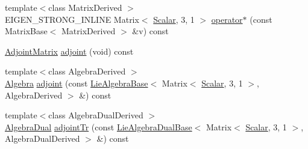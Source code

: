 \begin{DoxyCompactItemize}
\item 
{\footnotesize template$<$class Matrix\+Derived $>$ }\\E\+I\+G\+E\+N\+\_\+\+S\+T\+R\+O\+N\+G\+\_\+\+I\+N\+L\+I\+NE Matrix$<$ \hyperlink{class_lie_group_base_3_01_quaternion_3_01typename_01internal_1_1traits_3_01_derived_01_4_1_1_scalar_01_4_00_01_derived_01_4_afadeceb3b98e52deecc572e71efb82a8}{Scalar}, 3, 1 $>$ \hyperlink{class_lie_group_base_3_01_quaternion_3_01typename_01internal_1_1traits_3_01_derived_01_4_1_1_scalar_01_4_00_01_derived_01_4_acb8d7d01cc37f10c72eb76b65754b46a}{operator$\ast$} (const Matrix\+Base$<$ Matrix\+Derived $>$ \&v) const
\item 
\hyperlink{class_lie_group_base_3_01_quaternion_3_01typename_01internal_1_1traits_3_01_derived_01_4_1_1_scalar_01_4_00_01_derived_01_4_a78de97b1de2faa5ee198be16e6b61931}{Adjoint\+Matrix} \hyperlink{class_lie_group_base_3_01_quaternion_3_01typename_01internal_1_1traits_3_01_derived_01_4_1_1_scalar_01_4_00_01_derived_01_4_a75f0e03d56ddc8d87cf14b37bb3662d2}{adjoint} (void) const
\item 
{\footnotesize template$<$class Algebra\+Derived $>$ }\\\hyperlink{class_lie_group_base_3_01_quaternion_3_01typename_01internal_1_1traits_3_01_derived_01_4_1_1_scalar_01_4_00_01_derived_01_4_a0a25a28e133c962ab8524a766ae6a01c}{Algebra} \hyperlink{class_lie_group_base_3_01_quaternion_3_01typename_01internal_1_1traits_3_01_derived_01_4_1_1_scalar_01_4_00_01_derived_01_4_a0247c73a22ac8b68f598f49141d078e0}{adjoint} (const \hyperlink{class_lie_algebra_base}{Lie\+Algebra\+Base}$<$ Matrix$<$ \hyperlink{class_lie_group_base_3_01_quaternion_3_01typename_01internal_1_1traits_3_01_derived_01_4_1_1_scalar_01_4_00_01_derived_01_4_afadeceb3b98e52deecc572e71efb82a8}{Scalar}, 3, 1 $>$, Algebra\+Derived $>$ \&) const
\item 
{\footnotesize template$<$class Algebra\+Dual\+Derived $>$ }\\\hyperlink{class_lie_group_base_3_01_quaternion_3_01typename_01internal_1_1traits_3_01_derived_01_4_1_1_scalar_01_4_00_01_derived_01_4_a2ae739f86fece047d4d480127d5b5d55}{Algebra\+Dual} \hyperlink{class_lie_group_base_3_01_quaternion_3_01typename_01internal_1_1traits_3_01_derived_01_4_1_1_scalar_01_4_00_01_derived_01_4_a92f173f459bb220e1373f3adde873e51}{adjoint\+Tr} (const \hyperlink{class_lie_algebra_dual_base}{Lie\+Algebra\+Dual\+Base}$<$ Matrix$<$ \hyperlink{class_lie_group_base_3_01_quaternion_3_01typename_01internal_1_1traits_3_01_derived_01_4_1_1_scalar_01_4_00_01_derived_01_4_afadeceb3b98e52deecc572e71efb82a8}{Scalar}, 3, 1 $>$, Algebra\+Dual\+Derived $>$ \&) const

\end{DoxyCompactItemize}
